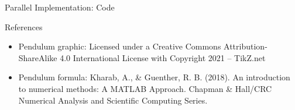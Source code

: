 \documentclass[t]{beamer}
\begin{document}
\begin{frame}{Parallel Implementation: Code}
\end{frame}

\begin{frame}{References}
\begin{itemize}
    \item Pendulum graphic: Licensed under a Creative Commons Attribution-ShareAlike 4.0 International License with Copyright 2021 – TikZ.net
    \item Pendulum formula: Kharab, A., \& Guenther, R. B. (2018). An introduction to numerical methods: A MATLAB Approach. Chapman \& Hall/CRC Numerical Analysis and Scientific Computing Series.
\end{itemize}
\end{frame}
\end{document}

